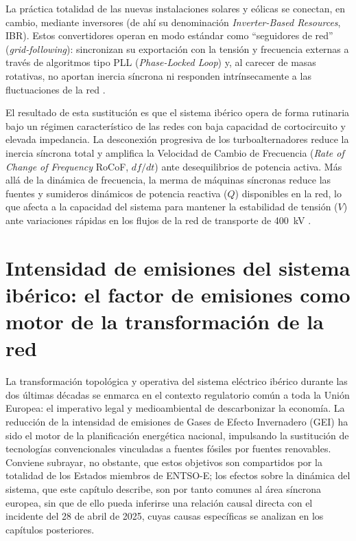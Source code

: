 La práctica totalidad de las nuevas instalaciones solares y eólicas se conectan, en
cambio, mediante inversores (de ahí su denominación \textit{Inverter-Based
Resources}, IBR). Estos convertidores operan en modo estándar como
``seguidores de red'' (\textit{grid-following}): sincronizan su exportación con la tensión
y frecuencia externas a través de algoritmos tipo PLL (\textit{Phase-Locked Loop}) y, al carecer
de masas rotativas, no aportan inercia síncrona ni responden intrínsecamente a
las fluctuaciones de la red \cite{nrel2025}.

El resultado de esta sustitución es que el sistema ibérico opera de forma
rutinaria bajo un régimen característico de las redes con baja capacidad de
cortocircuito y elevada impedancia. La desconexión progresiva de los
turboalternadores reduce la inercia síncrona total y amplifica la Velocidad de
Cambio de Frecuencia (\textit{Rate of Change of Frequency} RoCoF, $df/dt$) ante
desequilibrios de potencia activa. Más allá de la dinámica de frecuencia, la merma
de máquinas síncronas reduce las fuentes y sumideros dinámicos de potencia
reactiva ($Q$) disponibles en la red, lo que afecta a la capacidad del sistema
para mantener la estabilidad de tensión ($V$) ante variaciones rápidas en los
flujos de la red de transporte de 400~kV \cite{icai2025}.

\clearpage

\section{Intensidad de emisiones del sistema ibérico: el factor de emisiones como motor
de la transformación de la red}
\label{sec:intensidad_emisiones}

La transformación topológica y operativa del sistema eléctrico ibérico durante
las dos últimas décadas se enmarca en el contexto regulatorio común a toda la
Unión Europea: el imperativo legal y medioambiental de descarbonizar la
economía. La reducción de la intensidad de emisiones de Gases de Efecto
Invernadero (GEI) ha sido el motor de la planificación energética nacional,
impulsando la sustitución de tecnologías convencionales vinculadas a fuentes
fósiles por fuentes renovables. Conviene subrayar, no obstante, que estos
objetivos son compartidos por la totalidad de los Estados miembros de
ENTSO-E; los efectos sobre la dinámica del sistema, que este capítulo
describe, son por tanto comunes al área síncrona europea, sin que de ello
pueda inferirse una relación causal directa con el incidente del 28 de abril
de 2025, cuyas causas específicas se analizan en los capítulos posteriores.

